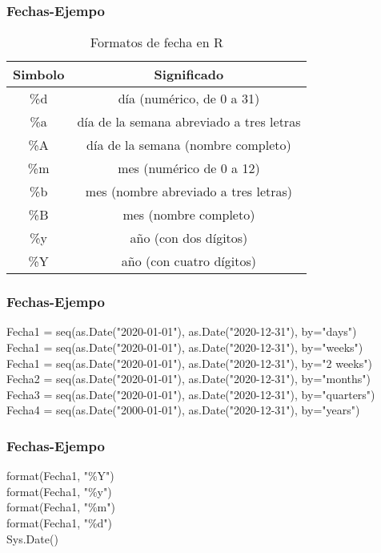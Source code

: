 \documentclass[14pt]{beamer}
\begin{document}
\begin{frame}
	\frametitle{Fechas-Ejempo}
	
	\begin{table}
		\caption{Formatos de fecha en R}
		\begin{tabular}{cc}
			\hline
			Simbolo& Significado \\
			\hline
			\%d &  día (numérico, de 0 a 31)\\
			
			\%a &  día de la semana abreviado a tres letras\\
			
			\%A & día de la semana (nombre completo)\\
			
			\%m &  mes (numérico de 0 a 12)\\
			
			\%b &  mes (nombre abreviado a tres letras)\\
			
			\%B &  mes (nombre completo)\\
			
			\%y &  año (con dos dígitos)\\
			
			\%Y &  año (con cuatro dígitos)\\
			\hline
		\end{tabular}
	\end{table}
	
\end{frame}

\begin{frame}
	\frametitle{Fechas-Ejempo}
	Fecha1 = seq(as.Date("2020-01-01"), as.Date("2020-12-31"), by="days")\\
	Fecha1 = seq(as.Date("2020-01-01"), as.Date("2020-12-31"), by="weeks")\\
	Fecha1 = seq(as.Date("2020-01-01"), as.Date("2020-12-31"), by="2 weeks")\\
	Fecha2 = seq(as.Date("2020-01-01"), as.Date("2020-12-31"), by="months")\\
	Fecha3 = seq(as.Date("2020-01-01"), as.Date("2020-12-31"), by="quarters")\\
	Fecha4 = seq(as.Date("2000-01-01"), as.Date("2020-12-31"), by="years")
	
\end{frame}

\begin{frame}
	\frametitle{Fechas-Ejempo}
	format(Fecha1, "\%Y")\\
	format(Fecha1, "\%y")\\
	format(Fecha1, "\%m")\\
	format(Fecha1, "\%d")\\
	Sys.Date()
	
\end{frame}
\end{document}
